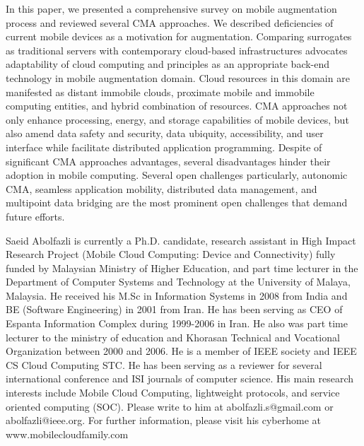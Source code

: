 \documentclass[publish]{IEEEtran}
\begin{document}
In this paper, we presented a comprehensive survey on mobile augmentation process and reviewed several CMA approaches. We described deficiencies of current mobile devices as a motivation for augmentation. Comparing surrogates as traditional servers with contemporary cloud-based infrastructures advocates adaptability of cloud computing and principles as an appropriate back-end technology in mobile augmentation domain. Cloud resources in this domain are manifested as distant immobile clouds, proximate mobile and immobile computing entities, and hybrid combination of resources. CMA approaches not only enhance processing, energy, and storage capabilities of mobile devices, but also amend data safety and security, data ubiquity, accessibility, and user interface while facilitate distributed application programming. Despite of significant CMA approaches advantages, several disadvantages hinder their adoption in mobile computing. Several open challenges particularly, autonomic CMA, seamless application mobility, distributed data management, and multipoint data bridging are the most prominent open challenges that demand future efforts.




\begin{biography}{Saeid Abolfazli} is currently a Ph.D. candidate, research assistant in High Impact Research Project (Mobile Cloud Computing: Device and Connectivity) fully funded by Malaysian Ministry of Higher Education, and part time lecturer in the Department of Computer Systems and Technology at the University of Malaya, Malaysia. He received his M.Sc in Information Systems in 2008 from India and BE (Software Engineering) in 2001 from Iran. He has been serving as CEO of Espanta Information Complex during 1999-2006 in Iran. He also was part time lecturer to the ministry of education and Khorasan Technical and Vocational Organization between 2000 and 2006. He is a member of IEEE society and IEEE CS Cloud Computing STC. He has been serving as a reviewer for several international conference and ISI journals of computer science. His main research interests include Mobile Cloud Computing, lightweight protocols, and service oriented computing (SOC). Please write to him at abolfazli.s@gmail.com or abolfazli@ieee.org. For further information, please visit his cyberhome at www.mobilecloudfamily.com
\end{biography}
\end{document}
